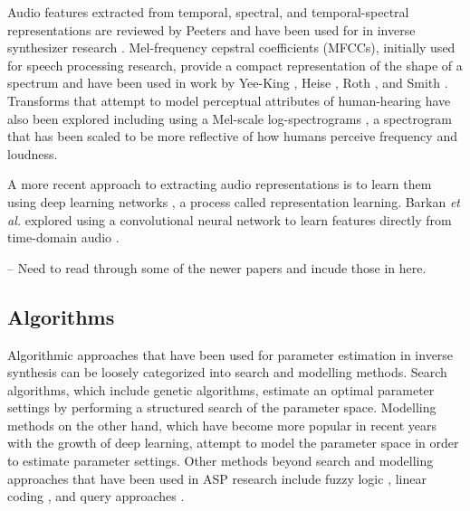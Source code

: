 Audio features extracted from temporal, spectral, and temporal-spectral representations are reviewed by Peeters \cite{peeters2004large} and have been used for in inverse synthesizer research \cite{mintz2007toward, stowell2010making, mcartwright2014, blancas2014sound}. Mel-frequency cepstral coefficients (MFCCs), initially used for speech processing research, provide a compact representation of the shape of a spectrum and have been used in work by Yee-King \cite{yee2008synthbot}, Heise \cite{ heise2009automatic}, Roth \cite{roth2011comparison}, and Smith \cite{smith2017play}. Transforms that attempt to model perceptual attributes of human-hearing have also been explored including using a Mel-scale log-spectrograms \cite{zhang2018visualization}, a spectrogram that has been scaled to be more reflective of how humans perceive frequency and loudness.

A more recent approach to extracting audio representations is to learn them using deep learning networks \cite{bengio2013representation}, a process called representation learning. Barkan \textit{et al.} explored using a convolutional neural network to learn features directly from time-domain audio \cite{barkan2019inversynth}.

-- Need to read through some of the newer papers and incude those in here.

\subsection{Algorithms}
Algorithmic approaches that have been used for parameter estimation in inverse synthesis can be loosely categorized into search and modelling methods. Search algorithms, which include genetic algorithms, estimate an optimal parameter settings by performing a structured search of the parameter space. Modelling methods on the other hand, which have become more popular in recent years with the growth of deep learning, attempt to model the parameter space in order to estimate parameter settings. Other methods beyond search and modelling approaches that have been used in ASP research include fuzzy logic \cite{mitchell2005frequency, hamadicharef2012intelligent}, linear coding \cite{mintz2007toward}, and query approaches \cite{mcartwright2014}.

